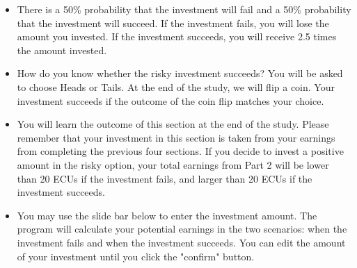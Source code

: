 \documentclass[thesis]{uathesis}
\begin{document}
\begin{body}
\begin{appendices}
\begin{itemize}
 \item  There is a 50\% probability that the investment will fail and a 50\% probability that the investment will succeed. If the investment fails, you will lose the amount you invested. If the investment succeeds, you will receive 2.5 times the amount invested.

 \item  How do you know whether the risky investment succeeds? You will be asked to choose Heads or Tails. At the end of the study, we will flip a coin. Your investment succeeds if the outcome of the coin flip matches your choice.

 \item You will learn the outcome of this section at the end of the study.  Please remember that your investment in this section is taken from your earnings from completing the previous four sections.  If you decide to invest a positive amount in the risky option, your total earnings from Part 2 will be lower than 20 ECUs if the investment fails, and larger than 20 ECUs if the investment succeeds.

 \item You may use the slide bar below to enter the investment amount. The program will calculate your potential earnings in the two scenarios: when the investment fails and when the investment succeeds. You can edit the amount of your investment until you click the "confirm" button.


\end{itemize}

\end{appendices}

\end{body}
\end{document}
